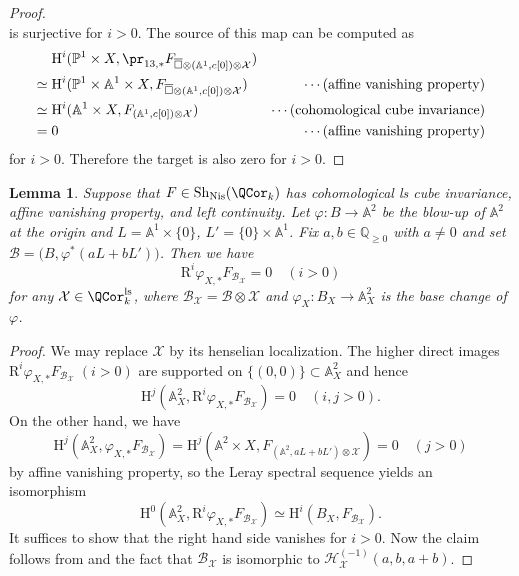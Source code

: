 \documentclass{amsart}
\theoremstyle{plain}
\newtheorem{lemma}[theorem]{Lemma}
\theoremstyle{definition}
\theoremstyle{remark}
\numberwithin{equation}{section}
\newcommand{\bcube}{{\overline{\square}}}
\DeclareMathOperator{\Sh}{Sh}
\def\Nis{\mathrm{Nis}}
\def\ls{\mathrm{ls}}
\begin{document}
\begin{proof}
$$	$$
	is surjective for $i>0$.
	The source of this map can be computed as
	\begin{align*}
		&\mathrm{H}^i(\mathbb{P}^1\times X, \pr_{13,*}F_{\bcube \otimes (\mathbb{A}^1,c[0])\otimes\mathcal{X}})\\
		\simeq{} &\mathrm{H}^i(\mathbb{P}^1\times\mathbb{A}^1\times X, F_{\bcube \otimes (\mathbb{A}^1,c[0])\otimes\mathcal{X}})
		&\cdots\text{(affine vanishing property)}\\
		\simeq{} &\mathrm{H}^i(\mathbb{A}^1\times X, F_{(\mathbb{A}^1,c[0])\otimes\mathcal{X}})
		&\cdots\text{(cohomological cube invariance)}\\
		={} &0
		&\cdots\text{(affine vanishing property)}
	\end{align*}
	for $i>0$.
	Therefore the target is also zero for $i>0$.
\end{proof}

\begin{lemma}\label{blowup-a2}
	Suppose that $F\in \Sh_\Nis(\QCor_k)$ has cohomological ls cube invariance, affine vanishing property, and left continuity.
	Let $\varphi\colon B\to \mathbb{A}^2$ be the blow-up of $\mathbb{A}^2$ at the origin and $L=\mathbb{A}^1\times\{0\}$, $L'=\{0\}\times\mathbb{A}^1$.
	Fix $a,b\in \mathbb{Q}_{\geq 0}$ with $a\neq 0$ and set $\mathcal{B}=\bigl(B,\varphi^*(a L+b L')\bigr)$.
	Then we have
	$$
		\mathrm{R}^i\varphi_{X,*}F_{\mathcal{B}_\mathcal{X}}=0\quad (i>0)
	$$
	for any $\mathcal{X}\in \QCor_k^\ls$, where $\mathcal{B}_\mathcal{X} =\mathcal{B}\otimes \mathcal{X}$ and $\varphi_X\colon B_X\to \mathbb{A}^2_X$ is the base change of $\varphi$.
\end{lemma}

\begin{proof}
	We may replace $\mathcal{X}$ by its henselian localization.
	The higher direct images $\mathrm{R}^i\varphi_{X,*}F_{\mathcal{B}_\mathcal{X}}\;(i>0)$ are supported on $\{(0,0)\}\subset\mathbb{A}^2_X$ and hence
	$$
		\mathrm{H}^j(\mathbb{A}^2_X, \mathrm{R}^i\varphi_{X,*}F_{\mathcal{B}_\mathcal{X}})=0\quad (i,j>0).
	$$
	On the other hand, we have
	$$
		\mathrm{H}^j(\mathbb{A}^2_X, \varphi_{X,*}F_{\mathcal{B}_\mathcal{X}})=\mathrm{H}^j(\mathbb{A}^2\times X,F_{(\mathbb{A}^2,a L+b L')\otimes \mathcal{X}})=0 \quad (j>0)
	$$
	by affine vanishing property, so the Leray spectral sequence yields an isomorphism
	$$
		\mathrm{H}^0(\mathbb{A}^2_X, \mathrm{R}^i\varphi_{X,*}F_{\mathcal{B}_\mathcal{X}})\simeq \mathrm{H}^i(B_X,F_{\mathcal{B}_\mathcal{X}}).
	$$
	It suffices to show that the right hand side vanishes for $i>0$.
	Now the claim follows from  and the fact that $\mathcal{B}_\mathcal{X}$ is isomorphic to $\mathcal{H}_\mathcal{X}^{(-1)}(a,b,a+b)$.
\end{proof}
\end{document}
